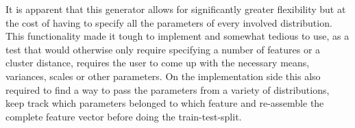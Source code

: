It is apparent that this generator allows for significantly greater flexibility but at the cost of having to specify all the parameters of every involved distribution.
This functionality made it tough to implement and somewhat tedious to use, as a test that would otherwise only require specifying a number of features or a cluster distance,
requires the user to come up with the necessary means, variances, scales or other parameters.
On the implementation side this also required to find a way to pass the parameters from a variety of distributions, keep track which parameters belonged to which feature
and re-assemble the complete feature vector before doing the train-test-split.

